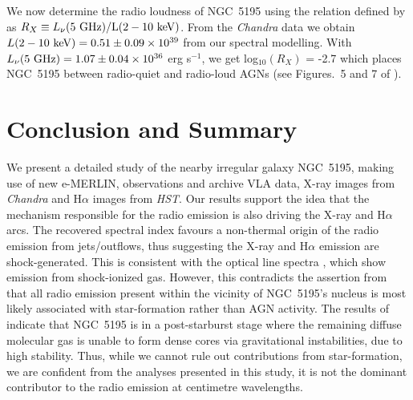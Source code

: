 \documentclass[fleqn,usenatbib]{mnras}
\def\figs{Figures.}
\begin{document}
{We now determine the radio loudness of NGC~5195 using the relation defined by \cite{TW2003} as $R_{X} \equiv L_{\nu}(5 ~\rm GHz)/L(2-10~ \rm keV)$. From the \textit{Chandra} data we obtain $L(2-10~ \rm keV) = 0.51 \pm 0.09 \times 10^{39}$ from our spectral modelling. With $L_{\nu}(5 ~\rm GHz) = 1.07 \pm 0.04 \times 10^{36}$ erg s$^{-1}$, we get log$_{10}(R_{X})$ = -2.7 which places NGC~5195 between radio-quiet and radio-loud AGNs (see \figs~5 and 7 of \citealt{Panessaetal2007}).}

\section{Conclusion and Summary}

We present a detailed study of the nearby irregular galaxy NGC~5195, making use of new e-MERLIN, 
observations and archive VLA data, X-ray images from \textit{Chandra} and H$\alpha$ images from 
\textit{HST}. 
{Our results support the idea that the mechanism responsible for the radio emission is also driving 
the X-ray and H$\alpha$ arcs. The recovered spectral index favours a non-thermal origin of the 
radio emission from jets/outflows, thus suggesting the X-ray and H$\alpha$ emission are shock-generated. This is consistent with 
the optical line spectra \citep{Hoopes-Walterbos}, which show emission from shock-ionized gas. 
However, this contradicts the assertion from \cite{Alataloetal2016} that all radio emission present 
within the vicinity of NGC~5195's nucleus is most likely associated with star-formation rather than AGN 
activity. The results of \cite{Kohnoetal2002} indicate that NGC~5195 is in a post-starburst stage where 
the remaining diffuse molecular gas is unable to form dense cores via gravitational 
instabilities, due to high stability. Thus, while we cannot rule out contributions from star-formation, we are confident from 
the analyses presented in this study, it is not the dominant contributor to the radio emission at 
centimetre wavelengths.} 
\end{document}
